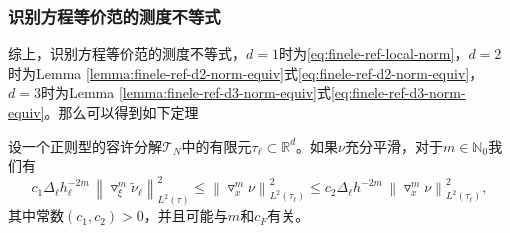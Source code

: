 \subsubsection{识别方程等价范的测度不等式}
综上，识别方程等价范的测度不等式，$d=1$时为\eqref{eq:finele-ref-local-norm}，$d=2$时为Lemma \ref{lemma:finele-ref-d2-norm-equiv}式\eqref{eq:finele-ref-d2-norm-equiv}，$d=3$时为Lemma \ref{lemma:finele-ref-d3-norm-equiv}式\eqref{eq:finele-ref-d3-norm-equiv}。那么可以得到如下定理

\begin{theorem}[识别方程等价范的测度不等式]
\label{theorem:finele-ref-d123-norm-equiv}
设一个正则型的容许分解$\mathcal{T}_{N}$中的有限元$\tau_{\ell} \subset \mathbb{R}^{d}$。如果$\nu$充分平滑，对于$m \in \mathbb{N}_{0}$我们有
\begin{equation*}
    c_{1} \Delta_{\ell} h_{\ell}^{-2m} \, \left\|
    \triangledown_{\xi}^{m} \widetilde{\nu}_{\ell}
    \right\|_{L^{2}(\tau)}^{2}
    \le \left\| \triangledown_{x}^{m} \nu
    \right\|_{L^{2}(\tau_{\ell})}^{2}
    \le c_{2} \Delta_{\ell} h^{-2m} \,
    \left\| \triangledown_{x}^{m} \nu
    \right\|_{L^{2}(\tau_{\ell})}^{2},
\end{equation*}
其中常数$\left(c_{1}, c_{2} \right)>0$，并且可能与$m$和$c_{F}$有关。
\end{theorem}
